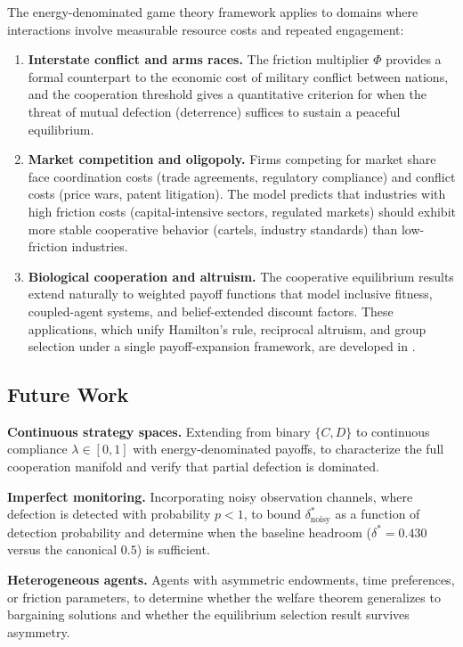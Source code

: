 \documentclass[11pt]{article}
\theoremstyle{plain}
\theoremstyle{definition}
\theoremstyle{remark}
\let\origsubsection\subsection
\renewcommand{\subsection}{\needspace{7\baselineskip}\origsubsection}
\begin{document}
The energy-denominated game theory framework applies to domains where
interactions involve measurable resource costs and repeated engagement:

\begin{enumerate}
\def\labelenumi{\arabic{enumi}.}
\item
  \textbf{Interstate conflict and arms races.} The friction multiplier
  \(\Phi\) provides a formal counterpart to the economic cost of
  military conflict between nations, and the cooperation threshold gives
  a quantitative criterion for when the threat of mutual defection
  (deterrence) suffices to sustain a peaceful equilibrium.
\item
  \textbf{Market competition and oligopoly.} Firms competing for market
  share face coordination costs (trade agreements, regulatory
  compliance) and conflict costs (price wars, patent litigation). The
  model predicts that industries with high friction costs
  (capital-intensive sectors, regulated markets) should exhibit more
  stable cooperative behavior (cartels, industry standards) than
  low-friction industries.
\item
  \textbf{Biological cooperation and altruism.} The cooperative
  equilibrium results extend naturally to weighted payoff functions that
  model inclusive fitness, coupled-agent systems, and belief-extended
  discount factors. These applications, which unify Hamilton's rule,
  reciprocal altruism, and group selection under a single
  payoff-expansion framework, are developed in \citep{Ethics-I}.
\end{enumerate}

\subsection{Future Work}\label{future-work}

\textbf{Continuous strategy spaces.} Extending from binary \(\{C, D\}\)
to continuous compliance \(\lambda \in [0,1]\) with energy-denominated
payoffs, to characterize the full cooperation manifold and verify that
partial defection is dominated.

\textbf{Imperfect monitoring.} Incorporating noisy observation channels,
where defection is detected with probability \(p < 1\), to bound
\(\delta^*_{\text{noisy}}\) as a function of detection probability and
determine when the baseline headroom (\(\delta^* = 0.430\) versus the
canonical \(0.5\)) is sufficient.

\textbf{Heterogeneous agents.} Agents with asymmetric endowments, time
preferences, or friction parameters, to determine whether the welfare
theorem generalizes to bargaining solutions and whether the equilibrium
selection result survives asymmetry.
\end{document}

